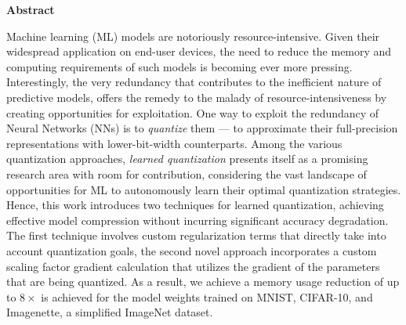\thispagestyle{empty}
\vspace*{1.0cm}

\begin{center}
    \textbf{Abstract} \label{abstract}
\end{center}

\vspace*{0.5cm}

\noindent Machine learning (ML) models are notoriously resource-intensive.
Given their widespread application on end-user devices,
the need to reduce the memory and computing requirements of such models is becoming ever more pressing.
Interestingly, the very redundancy that contributes to the inefficient nature of predictive models, 
offers the remedy to the malady of resource-intensiveness by creating opportunities for exploitation.
One way to exploit the redundancy of Neural Networks (NNs) is to 
\textit{quantize} them — 
to approximate their full-precision representations with lower-bit-width counterparts.
Among the various quantization approaches, 
\textit{learned quantization} presents itself as a promising research area with 
room for contribution, considering the vast landscape of opportunities for
ML to autonomously learn their optimal quantization strategies.
Hence, this work introduces two techniques for learned quantization,
achieving effective model compression without incurring significant accuracy degradation.
The first technique involves custom regularization terms that directly take into account
quantization goals, the second novel approach incorporates a custom scaling factor gradient calculation that utilizes 
the gradient of the parameters that are being quantized.
As a result, we achieve a memory usage reduction of up to \( 8 \times \) is achieved for the model weights
trained on MNIST, CIFAR-10, and Imagenette, a simplified ImageNet dataset. 
